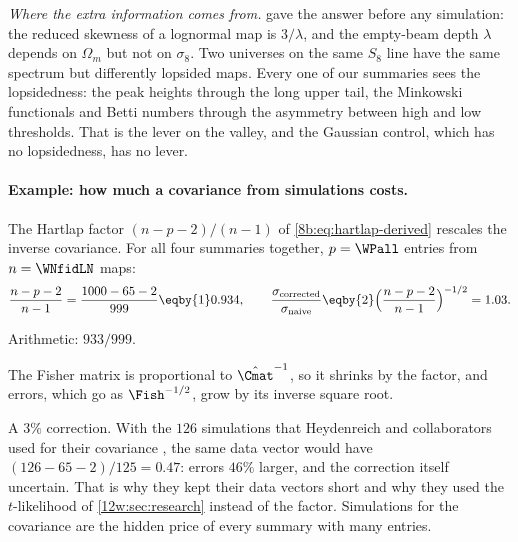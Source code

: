 \emph{Where the extra information comes from.}  gave the answer before any simulation: the
reduced skewness of a lognormal map is $3/\lambda$, and the empty-beam depth $\lambda$ depends on $\Omega_m$ but not on
$\sigma_8$. Two universes on the same $S_8$ line have the same spectrum but differently lopsided maps. Every one of our
summaries sees the lopsidedness: the peak heights through the long upper tail, the Minkowski functionals and Betti
numbers through the asymmetry between high and low thresholds. That is the lever on the valley, and the Gaussian
control, which has no lopsidedness, has no lever.

\paragraph{Example: how much a covariance from simulations costs.}
The Hartlap factor $(n-p-2)/(n-1)$ of \eqref{8b:eq:hartlap-derived} rescales the inverse covariance. For all four
summaries together, $p=\WPall$ entries from $n=\WNfidLN$ maps:
\begin{align*}
\frac{n-p-2}{n-1}=\frac{1000-65-2}{999}\eqby{1}0.934,\qquad
\frac{\sigma_{\rm corrected}}{\sigma_{\rm naive}}\eqby{2}\Bigl(\frac{n-p-2}{n-1}\Bigr)^{-1/2}=1.03 .
\end{align*}
\begin{explain}
  \item Arithmetic: $933/999$.
  \item The Fisher matrix is proportional to $\hat\Cmat^{-1}$, so it shrinks by the factor, and errors, which go as
        $\Fish^{-1/2}$, grow by its inverse square root.
\end{explain}
A $3\%$ correction. With the $126$ simulations that Heydenreich and collaborators used for their covariance
\cite{Heydenreich2021}, the same data vector would have $(126-65-2)/125=0.47$: errors $46\%$ larger, and the
correction itself uncertain. That is why they kept their data vectors short and why they used the $t$-likelihood of
\cref{12w:sec:research} instead of the factor. Simulations for the covariance are the hidden price of every summary
with many entries.


